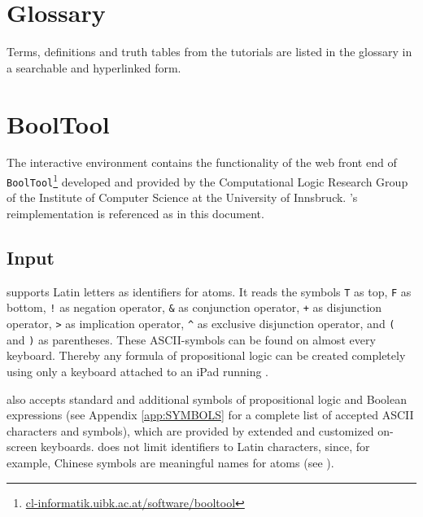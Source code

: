 \section{Glossary}

Terms, definitions and truth tables from the tutorials are listed in the glossary in a searchable and hyperlinked form.

\section{BoolTool}

The interactive environment contains the functionality of the
web front end of \texttt{BoolTool}\footnote{
\href{http://cl-informatik.uibk.ac.at/software/booltool/}{cl-informatik.uibk.ac.at/software/booltool}}
developed and provided by the Computational Logic Research Group
of the Institute of Computer Science at the University of Innsbruck.
\Nyaya's reimplementation is referenced as \BoolTool in this document.

\subsection{Input}

\BoolTool supports Latin letters as identifiers for atoms. 
It reads the symbols
\verb#T# as top, 
\verb#F# as bottom,
\verb#!# as negation operator, 
\verb#&# as conjunction operator,
\verb#+# as disjunction operator,
\verb#># as implication operator, 
\verb#^# as exclusive disjunction operator,
and \verb#(# and \verb#)# as parentheses.
These ASCII-symbols can be found on almost every keyboard.
Thereby any formula of propositional logic can be created completely
using only a keyboard attached to an iPad running \Nyaya.

\BoolTool also accepts standard 
and additional symbols of propositional logic and Boolean expressions
(see Appendix \vref{app:SYMBOLS} for a complete list of accepted ASCII characters and symbols),
which are provided by extended and customized on-screen keyboards.
\BoolTool does not limit identifiers to Latin characters, since, for example, 
Chinese symbols are meaningful names for atoms (see ).

